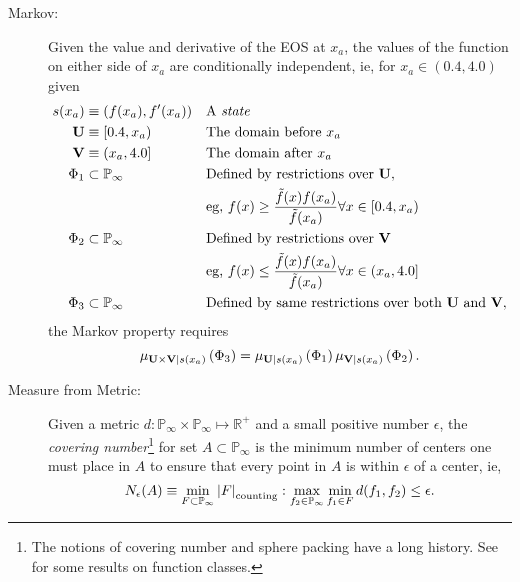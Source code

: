 \documentclass[]{article}
\newcommand{\nomf}{\tilde f} \newcommand{\COST}{\cal C}
\newcommand{\field}[1]{\mathbb{#1}}
\newcommand\REAL{\field{R}}
\newcommand\Polytope[1]{\field{P}_{#1}}
\newcommand\PolytopeInf{\Polytope{\infty}}
\begin{document}
\begin{description}
\item[Markov:] Given the value and derivative of the EOS at $x_a$,
    the values of the function on either side of $x_a$ are
    conditionally independent, ie, for $x_a \in (0.4,4.0)$ given
    \begin{align*}
      s(x_a) &\equiv (f(x_a),f'(x_a)) && \text{A \emph{state}}\\
      \mathbf{U} &\equiv [0.4,x_a) && \text{The domain before } x_a\\
      \mathbf{V} &\equiv (x_a,4.0] && \text{The domain after } x_a\\
      \Phi_1 &\subset \PolytopeInf && \text{Defined by restrictions
        over } \mathbf{U},\\
      &&& \text{eg, } f(x) \geq \frac{\nomf(x)f(x_a)}{\nomf(x_a)}
      \forall x \in [0.4, x_a)\\
      \Phi_2 &\subset \PolytopeInf && \text{Defined by restrictions
        over } \mathbf{V}\\
      &&& \text{eg, } f(x) \leq \frac{\nomf(x)f(x_a)}{\nomf(x_a)}
      \forall x \in (x_a, 4.0]\\
      \Phi_3 &\subset \PolytopeInf && \text{Defined by same restrictions
        over both } \mathbf{U}\text{ and }\mathbf{V},
    \end{align*}
    the Markov property requires
    \begin{equation}
      \label{eq:markov}
      \mu_{\mathbf{U}\times\mathbf{V}|s(x_a)}\left(\Phi_3 \right) =
      \mu_{\mathbf{U}|s(x_a)}\left(\Phi_1 \right)
      \mu_{\mathbf{V}|s(x_a)}\left(\Phi_2 \right).
    \end{equation}
  \item[Measure from Metric:] Given a metric
    $d:\PolytopeInf\times\PolytopeInf \mapsto \REAL^+$ and a small
    positive number $\epsilon$, the \emph{covering
      number}\footnote{The notions of covering number and sphere
      packing have a long history.  See \cite{Bartlett97} for some
      results on function classes.} for set $A
    \subset \PolytopeInf$ is the minimum number of centers one must
    place in $A$ to ensure that every point in $A$ is within
    $\epsilon$ of a center, ie,
    \begin{equation*}
      N_\epsilon(A) \equiv \min_{F\subset \PolytopeInf}
      \left| F \right|_{\rm{counting}} :
      \max_{f_2 \in \PolytopeInf}
      \min_{f_1\in F}
      d(f_1,f_2) \leq \epsilon.
    \end{equation*}

\end{description}
\end{document}
